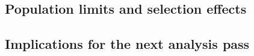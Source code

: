 %

\subsection{Population limits and selection effects}
\label{sec:disc-population-limits}

%

\subsection{Implications for the next analysis pass}
\label{sec:disc-next-pass}


